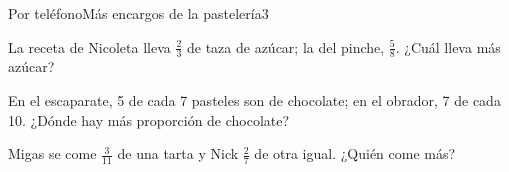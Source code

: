 \documentclass[11pt]{article}
\begin{document}
\begin{dorso}{Por teléfono}{Más encargos de la pastelería}{3}
\vspace{1.5mm}
{\small
{}La receta de Nicoleta lleva $\frac{2}{3}$ de taza de azúcar; la del
pinche, $\frac{5}{8}$. ¿Cuál lleva más azúcar? \hueco[2.4cm]\par\vspace{8mm}

En el escaparate, 5 de cada 7 pasteles son de chocolate; en el obrador, 7
de cada 10. ¿Dónde hay más proporción de chocolate? \hueco[2.4cm]\par\vspace{8mm}

Migas se come $\frac{3}{11}$ de una tarta y Nick $\frac{2}{7}$ de otra
igual. ¿Quién come más? \hueco[2.4cm]\par\vspace{6mm}}


\end{dorso}
\end{document}
